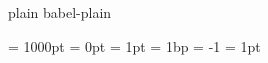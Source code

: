 \ifnocontextobject \donetrue \do \newif\ifdone \fi


\def\!!stringa{plain}       \ifx\!!stringa\fmtname \donetrue  \else
\def\!!stringa{babel-plain} \ifx\!!stringa\fmtname \donetrue  \else
                                                   \donefalse \fi \fi

\ifdone
  \newdimen\scratchdimen %
  \newdimen\scratchdimen %
  \newdimen\scratchdimen %
  \newdimen\scratchdimen %
  \newdimen\scratchdimen %
  \newdimen\scratchdimen %
\fi

\ifnocontextobject \scratchcounter \do \newcount  \scratchcounter \fi
\ifnocontextobject \scratchtoks    \do \newtoks   \scratchtoks    \fi
\ifnocontextobject \scratchdimen   \do \newdimen  \scratchdimen   \fi
\ifnocontextobject \scratchskip    \do \newskip   \scratchskip    \fi
\ifnocontextobject \scratchmuskip  \do \newmuskip \scratchmuskip  \fi
\ifnocontextobject \scratchbox     \do \newbox    \scratchbox     \fi
\ifnocontextobject \scratchread    \do \newread   \scratchread    \fi
\ifnocontextobject \scratchwrite   \do \newwrite  \scratchwrite   \fi

\ifnocontextobject \zeropoint      \do \newdimen  \zeropoint      \fi %
\ifnocontextobject \onepoint       \do \newdimen  \onepoint       \fi
\ifnocontextobject \onebasepoint   \do \newdimen  \onebasepoint   \fi
\ifnocontextobject \zerocount      \do \chardef   {}   \fi
\ifnocontextobject \plusone        \do \chardef   {}   \fi
\ifnocontextobject \minusone       \do \newcount  \minusone       \fi

\ifnocontextobject \thousandpoint  \do \newdimen  \thousandpoint  \fi

\ifnocontextobject \onerealpoint   \do \newdimen  \onerealpoint   \fi %

\thousandpoint = 1000pt
\zeropoint     =    0pt
\onepoint      =    1pt
\onebasepoint  =    1bp
\minusone      =   -1
\onerealpoint  =    1pt

\ifnocontextobject \emptytoks      \do \newtoks   \emptytoks      \fi

\ifnocontextobject \nextbox   \do \newbox   \nextbox   \fi
\ifnocontextobject \nextdepth \do \newdimen \nextdepth \fi

\ifnocontextobject \CONTEXTtrue            \do \newif\ifCONTEXT            \fi
\ifnocontextobject \eightbitcharacterstrue \do \newif\ifeightbitcharacters \fi
\ifnocontextobject \MPdrawingdonetrue      \do \newif\ifMPdrawingdone      \fi

